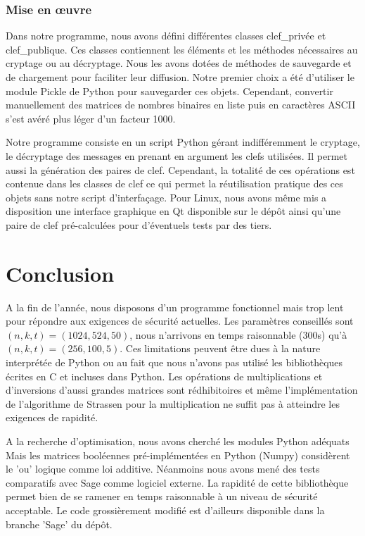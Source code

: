 \documentclass{article}
\begin{document}
		\section*{Mise en œuvre}
			Dans notre programme, nous avons défini différentes classes clef\_privée et clef\_publique.
			Ces classes contiennent les éléments et les méthodes nécessaires au cryptage ou au décryptage.
			Nous les avons dotées de méthodes de sauvegarde et de chargement pour faciliter leur diffusion.
			Notre premier choix a été d'utiliser le module Pickle de Python pour sauvegarder ces objets.
			Cependant, convertir manuellement des matrices de nombres binaires en liste puis en caractères ASCII s'est avéré plus léger d'un facteur 1000.

			Notre programme consiste en un script Python gérant indifféremment le cryptage, le décryptage des messages en prenant en argument les clefs utilisées.
			Il permet aussi la génération des paires de clef.
			Cependant, la totalité de ces opérations est contenue dans les classes de clef ce qui permet la réutilisation pratique des ces objets sans notre script d’interfaçage.
			Pour Linux, nous avons même mis a disposition une interface graphique en Qt disponible sur le dépôt ainsi qu'une paire de clef pré-calculées pour d'éventuels tests par des tiers.

	\part*{Conclusion}

		A la fin de l'année, nous disposons d'un programme fonctionnel mais trop lent pour répondre aux exigences de sécurité actuelles.
		Les paramètres conseillés sont $(n,k,t) = (1024,524,50)$, nous n'arrivons en temps raisonnable (300s) qu'à $(n,k,t) = (256,100,5)$.
		Ces limitations peuvent être dues à la nature interprétée de Python ou au fait que nous n'avons pas utilisé les bibliothèques écrites en C et incluses dans Python.
		Les opérations de multiplications et d'inversions d'aussi grandes matrices sont rédhibitoires et même l'implémentation de l'algorithme de Strassen pour la multiplication ne suffit pas à atteindre les exigences de rapidité.

		A la recherche d'optimisation, nous avons cherché les modules Python adéquats
		Mais les matrices booléennes pré-implémentées en Python (Numpy) considèrent le 'ou' logique comme loi additive.
		Néanmoins nous avons mené des tests comparatifs avec Sage comme logiciel externe.
		La rapidité de cette bibliothèque permet bien de se ramener en temps raisonnable à un niveau de sécurité acceptable.
		Le code grossièrement modifié est d'ailleurs disponible dans la branche 'Sage' du dépôt.
\end{document}
